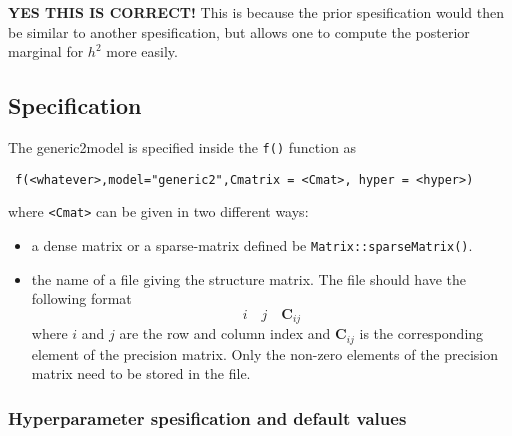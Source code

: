 \documentclass[a4paper,11pt]{article}
\begin{document}
\textbf{YES THIS IS CORRECT!} This is because the prior spesification
would then be similar to another spesification, but allows one to
compute the posterior marginal for $h^{2}$ more easily.

\subsection*{Specification}

The generic2model is specified inside the {\tt f()} function as
\begin{verbatim}
 f(<whatever>,model="generic2",Cmatrix = <Cmat>, hyper = <hyper>)
\end{verbatim}
where {\tt <Cmat>} can be given in two different ways:
\begin{itemize}
\item a dense matrix or a sparse-matrix defined be
    \texttt{Matrix::sparseMatrix()}.
\item the name of a file giving the structure matrix. The file should
    have the following format
    \[
    i\quad j\quad \mathbf{C}_{ij}
    \]
    where $i$ and $j$ are the row and column index and
    $\mathbf{C}_{ij}$ is the corresponding element of the precision
    matrix. Only the non-zero elements of the precision matrix need to
    be stored in the file.
\end{itemize}

\subsubsection*{Hyperparameter spesification and default values}

\end{document}
